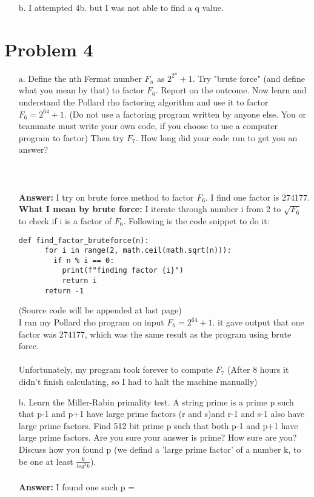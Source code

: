 \documentclass[12pt,letterpaper]{article}
\begin{document}
\begin{enumerate}
    \item[b.] I attempted 4b. but I was not able to find a q value. 
\end{enumerate}
\section*{Problem 4}
\setcounter{equation}{0}

\begin{enumerate}
  \item[a.]
  Define the nth Fermat number $F_n$ as $2^{2^n} + 1$. Try "brute force" (and define what you mean by that) to factor $F_6$. Report on the outcome. Now learn and understand the Pollard rho factoring algorithm and use it to factor $F_6 = 2^{64} + 1$. (Do not use a factoring program written by anyone else. You or teammate must write your own code, if you choose to use a computer program to factor) Then try $F_7$. How long did your code run to get you an answer?\\\\\\\\
  \textbf{Answer:}
  I try on brute force method to factor $F_6$. I find one factor is 274177.\\
  \textbf{What I mean by brute force: } I iterate through number i from 2 to $\sqrt{F_6}$ to check if i is a factor of $F_6$. Following is the code snippet to do it:
  \begin{lstlisting}[style = Python, caption={Brute force factoring}]
    def find_factor_bruteforce(n):
      for i in range(2, math.ceil(math.sqrt(n))):
        if n % i == 0:
          print(f"finding factor {i}")
          return i
      return -1
  \end{lstlisting}

  
  (Source code will be appended at last page)\\
  I ran my Pollard rho program on input $F_6 = 2^{64} + 1$. it gave output that one factor was 274177, which was the same result as the program using brute force. \\\\
  Unfortunately, my program took forever to compute $F_7$ (After 8 hours it didn't finish calculating, so I had to halt the machine manually)
  
  
  \item[b.] 
  Learn the Miller-Rabin primality test.
  A string prime is a prime p such that p-1 and p+1 have large prime factors (r and s)and r-1 and s-1 also have large prime factors. Find 512 bit prime p such that both p-1 and p+1 have large prime factors. Are you sure your answer is prime? How sure are you? Discuss how you found p (we defind a 'large prime factor' of a number k, to be one at least $\frac{k}{log^3 k}$).\\\\
  \textbf{Answer: } I found one such p = \\


\end{enumerate}
\end{document}
